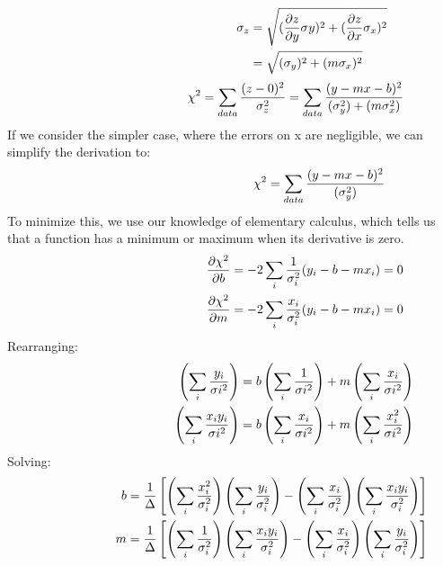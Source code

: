 \begin{align} \hspace{44 mm}
\sigma_{z}&=\sqrt{(\frac{\partial z }{\partial y} \sigma_{}y)^{2}+(\frac{\partial z}{\partial x}\sigma_{x})^{2}}\\
\hspace{9mm}&=\sqrt{(\sigma_{y})^{2}+(m\sigma_{x})^{2}}
\end{align}
\begin{equation}\hspace{35mm}
\chi^{2}=\sum_{data}\frac{(z-0)^{2}}{\sigma_{z}^{2}}=\sum_{data}\frac{(y-mx-b)^{2}}{(\sigma_{y}^{2})+(m\sigma_{x}^{2})}
\end{equation}
\noindent
If we consider the simpler case, where the errors on x are negligible, we can simplify the derivation to: 
\begin{equation}\hspace{48mm}
\chi^{2}=\sum_{data}\frac{(y-mx-b)^{2}}{(\sigma_{y}^{2})}
\end{equation}
To minimize this, we use our knowledge of elementary calculus, which tells us that a function has a minimum or maximum when its derivative is zero.
\begin{align}\hspace{40mm}
\frac{\partial\chi^2  }{\partial b}=-2\sum_{i}\frac{1}{\sigma_{i}^{2}}(y_{i}-b-mx_{i})=0\\
\frac{\partial\chi^2  }{\partial m}=-2\sum_{i}\frac{x_{i}}{\sigma_{i}^{2}}(y_{i}-b-mx_{i})=0
\end{align}
Rearranging: 
\begin{align}\hspace{35mm}
\left(\sum_{i}\frac{y_{i}}{\sigma{i}^{2}}\right)=b\left(\sum_{i}\frac{{1}}{\sigma{i}^{2}}\right)+m\left(\sum_{i}\frac{x_{i}}{\sigma{i}^{2}}\right)\\
\left(\sum_{i}\frac{x_{i}y_{i}}{\sigma{i}^{2}}\right)=b\left(\sum_{i}\frac{{x_{i}}}{\sigma{i}^{2}}\right)+m\left(\sum_{i}\frac{x_{i}^{2}}{\sigma{i}^{2}}\right)
\end{align}
Solving: 
\begin{align}\hspace{23mm}
b=\frac{1}{\Delta}\left[ \left(\sum_{i}\frac{x_{i}^{2}}{\sigma_{i}^{2}} \right ) \left(\sum_{i}\frac{y_{i}}{\sigma_{i}^{2}} \right)-\left( \sum_{i}\frac{x_{i}}{\sigma_{i}^{2}}\right)\left(\sum_{i}\frac{x_{i}y_{i}}{\sigma_{i}^{2}}\right )\right]\\
m=\frac{1}{\Delta}\left[ \left(\sum_{i}\frac{1}{\sigma_{i}^{2}} \right ) \left(\sum_{i}\frac{x_{i}y_{i}}{\sigma_{i}^{2}} \right)-\left( \sum_{i}\frac{x_{i}}{\sigma_{i}^{2}}\right)\left(\sum_{i}\frac{y_{i}}{\sigma_{i}^{2}}\right )\right]
\end{align}

